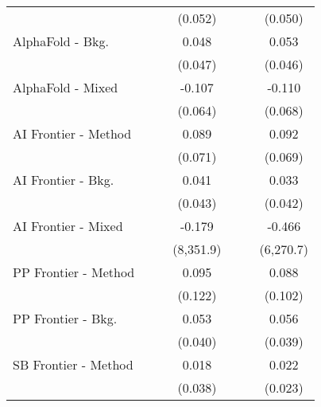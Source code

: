 \begin{tabular}{lcccccc}
                                &              &         & (0.052)   &               &             & (0.050)\\   
   AlphaFold - Bkg.             &              &         & 0.048     &               &             & 0.053\\   
                                &              &         & (0.047)   &               &             & (0.046)\\   
   AlphaFold - Mixed            &              &         & -0.107    &               &             & -0.110\\   
                                &              &         & (0.064)   &               &             & (0.068)\\   
   AI Frontier - Method         &              &         & 0.089     &               &             & 0.092\\   
                                &              &         & (0.071)   &               &             & (0.069)\\   
   AI Frontier - Bkg.           &              &         & 0.041     &               &             & 0.033\\   
                                &              &         & (0.043)   &               &             & (0.042)\\   
   AI Frontier - Mixed          &              &         & -0.179    &               &             & -0.466\\   
                                &              &         & (8,351.9) &               &             & (6,270.7)\\   
   PP Frontier - Method         &              &         & 0.095     &               &             & 0.088\\   
                                &              &         & (0.122)   &               &             & (0.102)\\   
   PP Frontier - Bkg.           &              &         & 0.053     &               &             & 0.056\\   
                                &              &         & (0.040)   &               &             & (0.039)\\   
   SB Frontier - Method         &              &         & 0.018     &               &             & 0.022\\   
                                &              &         & (0.038)   &               &             & (0.023)\\   

\end{tabular}
